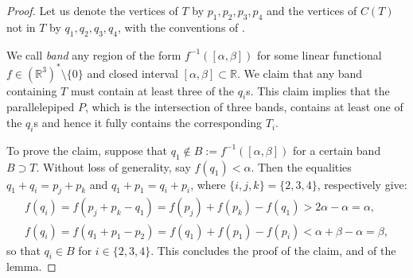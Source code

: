 \documentclass{amsart}
\theoremstyle{plain}
\theoremstyle{definition}
\newcommand{\R}{ \ensuremath{\mathbb{R}}}
\begin{document}
\begin{proof}
Let us denote the vertices of $T$ by $p_1, p_2, p_3, p_4$ and the vertices of $C(T)$ not in $T$ by $q_1, q_2, q_3, q_4$, with the conventions of . 

We call \emph{band} any region of the form $f^{-1}([\alpha,\beta])$ for some linear functional $f\in (\R^3)^*\setminus \{0\}$ and closed interval $[\alpha,\beta]\subset \R$.
We claim that any band containing $T$ must contain at least three of the $q_i$s. 
This claim implies that the parallelepiped $P$, which is the intersection of three bands, contains at least one of the $q_i$s and hence it fully contains the corresponding $T_i$.

To prove the claim, suppose that $q_1\not\in B:= f^{-1}([\alpha,\beta])$ for a certain band $B \supset T$. 
Without loss of generality, say $f(q_1)<\alpha$. Then the equalities $q_1+q_i=p_j+p_k$ and $q_1+p_1=q_i+p_i$, where $\{i,j,k\}=\{2,3,4\}$, respectively give:
\begin{gather}
\label{eq:first}
f(q_i) = f(p_j+p_k-q_1) = f(p_j)+f(p_k)-f(q_1) > 2\alpha-\alpha=\alpha,\\
\label{eq:second}
f(q_i) = f(q_1+p_1-p_2) = f(q_1)+f(p_1)-f(p_i) < \alpha + \beta-\alpha = \beta,
\end{gather}
so that $q_i \in B$ for $i\in \{2,3,4\}$.
%
%
%
This concludes the proof of the claim, and of the lemma.

\end{proof}
\end{document}
